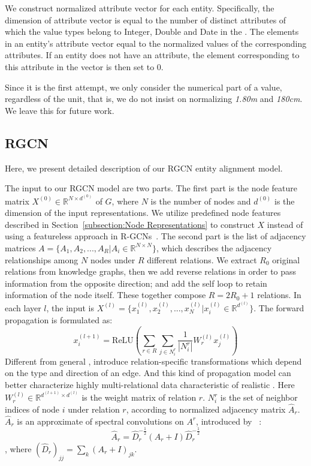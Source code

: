 	We construct normalized attribute vector for each entity. 
	Specifically, the dimension of attribute vector is equal to the number of distinct attributes of which the value types belong to Integer, Double and Date in the \KG. 
	The elements in an entity’s attribute vector equal to the normalized values of the corresponding attributes. 
	If an entity does not have an attribute, the element corresponding to this attribute in the vector is then set to 0.
	
	Since it is the first attempt, we only consider the numerical part of a value, regardless of the unit, that is, we do not insist on normalizing \emph{1.80m} and \emph{180cm}. 
	We leave this for future work.
	
	\subsection{RGCN}
	\label{section:rgcn}
	Here, we present detailed description of our RGCN entity alignment model.
	
	The input to our RGCN model are two parts. The first part is the node feature matrix $X^{(0)} \in \mathbb{R}^{N \times d^{(0)}}$ of $G$, where $N$ is the number of nodes and $d^{(0)}$ is the dimension of the input representations. We utilize predefined node features described in Section~\ref{subsection:Node Representations} to construct $X$ instead of using a featureless approach in R-GCNs~\cite{Schlichtkrull2017Modeling}.
	The second part is the list of adjacency matrices $A=\{A_1,A_2,...,A_R |A_i \in \mathbb{R}^{N \times N} \}$, which describes the adjacency relationships among $N$ nodes under $R$ different relations. We extract $R_0$ original relations from knowledge graphs, then we add reverse relations in order to pass information from the opposite direction; and add the self loop to retain information of the node itself. These together compose $R=2R_0+1$ relations.
	In each layer $l$, the input is $X^{(l)} = \{x^{(l)}_1,x^{(l)}_2,...,x^{(l)}_{N} |x^{(l)}_{i} \in \mathbb{R}^{d^{(l)}}\}$. The forward propagation is formulated as:
	\begin{equation}
	x_i^{(l+1)}=\mathrm{ReLU} (\sum\limits_{r \in R}\sum\limits_{j \in N_i^r}\frac{1}{|N_i^r|}W_r^{(l)}x_j^{(l)})
	\end{equation}
	Different from general \GCNs, \RGCNs introduce relation-specific transformations which depend on the type and direction of an edge. And this kind of propagation model can better characterize highly multi-relational data characteristic of realistic \KGs. Here $W_r^{(l)} \in \mathbb{R}^{d^{(l+1)} \times d^{(l)}}$ is the weight matrix of relation $r$. $N_i^r$ is the set of neighbor indices of node $i$ under relation $r$, according to normalized adjacency matrix $\hat A_r$. $\hat A_r$ is an approximate of spectral convolutions on $A^r$, introduced by ~\cite{Kipf2016Semi}:
	\begin{equation}
	\hat A_r=\hat D_r^{- \frac{1}{2}}(A_r+I)\hat D_r^{- \frac{1}{2}}
	\end{equation}
	, where $(\hat D_r)_{jj}=\sum_k(A_r+I)_{jk}$.
	
